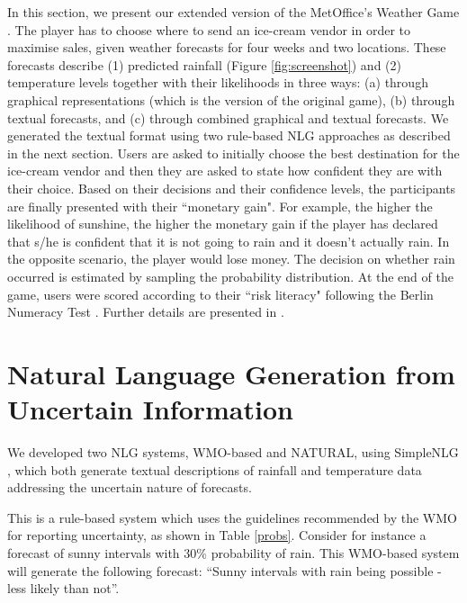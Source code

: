 \documentclass[11pt]{article}
\begin{document}
In this section, we present our extended version of the MetOffice's Weather Game \cite{Stephens2011}. The player has to choose where to send an ice-cream vendor in order to maximise sales, given weather forecasts for four weeks and two locations. These forecasts describe (1) predicted rainfall (Figure \ref{fig:screenshot}) and (2)  temperature levels together with their likelihoods
 in three ways: (a) through graphical representations (which is the version of the original game), (b) through textual forecasts, and (c) through combined graphical and textual forecasts. We generated the textual format using two rule-based NLG approaches as described in the next section. Users are asked to initially choose the best destination for the ice-cream vendor %
 and then they are asked to state how confident they are with their choice. %
 Based on their decisions and their confidence levels, the participants are finally presented with their ``monetary gain". For example, the higher the likelihood of sunshine, the higher the monetary gain if the player has declared that s/he is confident that it is not going to rain and it doesn't actually rain. In the opposite scenario, the player would lose money. %
 The decision on whether rain occurred is estimated by sampling the probability distribution. %
 At the end of the game, users were scored according to their ``risk literacy" following the Berlin Numeracy Test \cite{Cokely:2012}. %
Further details are presented in \cite{gkatzia-EtAl:2015:ENLG}.

\section{Natural Language Generation from Uncertain Information} \label{NLG}

We developed two NLG systems, WMO-based and NATURAL, using SimpleNLG \cite{SimpleNLG}, which both generate textual descriptions of rainfall and temperature data addressing the uncertain nature of forecasts. %

 This is a rule-based system which uses the guidelines recommended by the WMO \cite{WMO:2008} for reporting uncertainty, as shown in Table \ref{probs}. 
Consider for instance a forecast of sunny intervals with 30\% probability of rain. This WMO-based system will generate the following forecast: ``Sunny intervals with rain being possible - less likely than not''.
\end{document}
